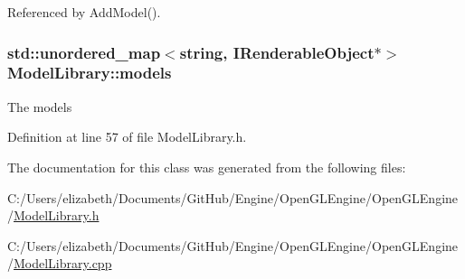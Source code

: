 Referenced by Add\+Model().

\subsubsection[{\texorpdfstring{models}{models}}]{\setlength{\rightskip}{0pt plus 5cm}std\+::unordered\+\_\+map$<${\bf string}, {\bf I\+Renderable\+Object}$\ast$$>$ Model\+Library\+::models\hspace{0.3cm}{\ttfamily [private]}}\hypertarget{class_model_library_a96a5beac0ac16cd79317772448e78487}{}\label{class_model_library_a96a5beac0ac16cd79317772448e78487}


The models 



Definition at line 57 of file Model\+Library.\+h.



The documentation for this class was generated from the following files\+:\begin{DoxyCompactItemize}
\item 
C\+:/\+Users/elizabeth/\+Documents/\+Git\+Hub/\+Engine/\+Open\+G\+L\+Engine/\+Open\+G\+L\+Engine/\hyperlink{_model_library_8h}{Model\+Library.\+h}\item 
C\+:/\+Users/elizabeth/\+Documents/\+Git\+Hub/\+Engine/\+Open\+G\+L\+Engine/\+Open\+G\+L\+Engine/\hyperlink{_model_library_8cpp}{Model\+Library.\+cpp}\end{DoxyCompactItemize}
